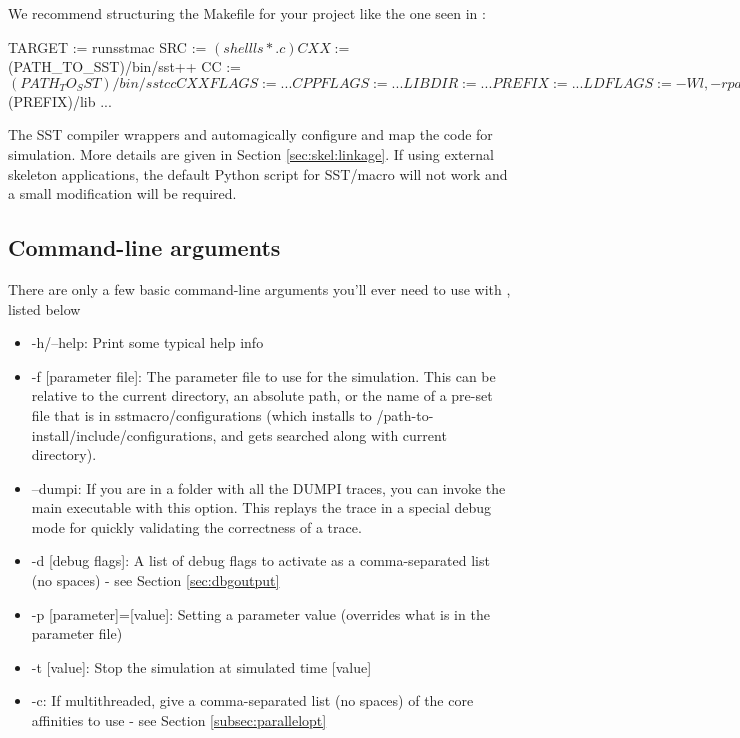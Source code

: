 We recommend structuring the Makefile for your project like the one seen in  :

\begin{ViFile}
TARGET := runsstmac
SRC := $(shell ls *.c) 

CXX :=      $(PATH_TO_SST)/bin/sst++
CC :=        $(PATH_TO_SST)/bin/sstcc
CXXFLAGS := ...
CPPFLAGS := ...
LIBDIR :=  ...
PREFIX :=   ...
LDFLAGS :=  -Wl,-rpath,$(PREFIX)/lib
...
\end{ViFile}
The SST compiler wrappers  and  automagically configure and map the code for simulation.  More details are given in Section \ref{sec:skel:linkage}.  If using external skeleton applications, the default Python script for SST/macro will not work and a small modification will be required.

\subsection{Command-line arguments}
\label{subsec:tutorial:cmdline}

There are only a few basic command-line arguments you'll ever need to use with \sstmacro, listed below

\begin{itemize}
\item -h/--help: Print some typical help info
\item -f [parameter file]: The parameter file to use for the simulation.  
This can be relative to the current directory, an absolute path, or the name of a pre-set file that is in sstmacro/configurations 
(which installs to /path-to-install/include/configurations, and gets searched along with current directory). 
\item --dumpi: If you are in a folder with all the DUMPI traces, you can invoke the main  executable with this option.  This replays the trace in a special debug mode for quickly validating the correctness of a trace.
\item -d [debug flags]: A list of debug flags to activate as a comma-separated list (no spaces) - see Section \ref{sec:dbgoutput}
\item -p [parameter]=[value]: Setting a parameter value (overrides what is in the parameter file)
\item -t [value]: Stop the simulation at simulated time [value]
\item -c: If multithreaded, give a comma-separated list (no spaces) of the core affinities to use - see Section \ref{subsec:parallelopt}
\end{itemize}

